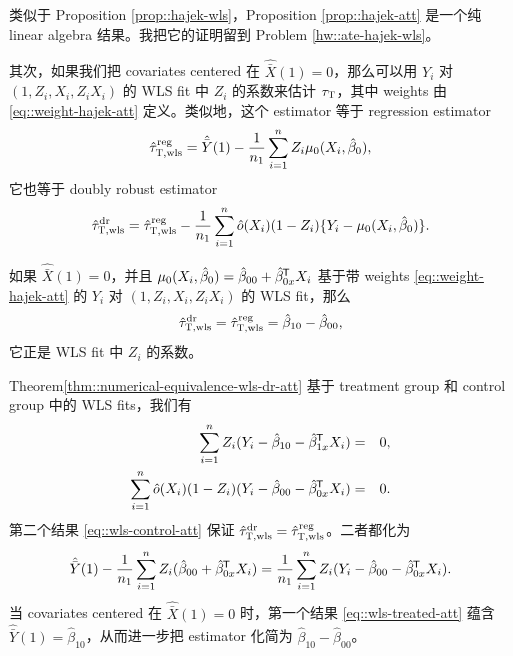 类似于 Proposition \ref{prop::hajek-wls}，Proposition \ref{prop::hajek-att} 是一个纯 linear algebra 结果。我把它的证明留到 Problem \ref{hw::ate-hajek-wls}。


其次，如果我们把 covariates centered 在 $\hat{\bar{X}}(1) = 0$，那么可以用 $Y_i$ 对 $(1,Z_i, X_i, Z_iX_i)$ 的 WLS fit 中 $Z_i$ 的系数来估计 $\tau_\textsc{T}$，其中 weights 由 \eqref{eq::weight-hajek-att} 定义。类似地，这个 estimator 等于 regression estimator
$$
\hat{\tau}_{\textsc{T},\text{wls}}^\text{reg} = \hat{\bar{Y}}(1) - \frac{1}{n_1} \sum_{i=1}^n Z_i \mu_0(X_i, \hat{\beta}_0),
$$
它也等于 doubly robust estimator
$$
\hat{\tau}_{\textsc{T},\text{wls}}^\text{dr} =\hat{\tau}_{\textsc{T},\text{wls}}^\text{reg} 
- \frac{1}{n_1} \sum_{i=1}^n  \hat{o}(X_i)  (1-Z_i) \{  Y_i- \mu_0(X_i, \hat{\beta}_0) \} .
$$

\begin{theorem}
\label{thm::numerical-equivalence-wls-dr-att}
如果 $\hat{\bar{X}}(1) = 0$，并且 $ \mu_0(X_i, \hat{\beta}_0) =  \hat \beta_{00} +   \hat\beta_{0x}^{\mkern-1.5mu\mathsf{T}} X_i$ 基于带 weights \eqref{eq::weight-hajek-att} 的 $Y_i$ 对 $(1,Z_i, X_i, Z_iX_i)$ 的 WLS fit，那么
$$
\hat{\tau}_{\textsc{T},\textup{wls}}^\textup{dr}  = \hat{\tau}_{\textsc{T},\textup{wls}}^\textup{reg} 
= \hat \beta_{10} - \hat \beta_{00} ,
$$
它正是 WLS fit 中 $Z_i$ 的系数。
\end{theorem}


\begin{myproof}{Theorem}{\ref{thm::numerical-equivalence-wls-dr-att}}
基于 treatment group 和 control group 中的 WLS fits，我们有
\begin{eqnarray}
\label{eq::wls-treated-att}
\sum_{i=1}^n Z_i ( Y_i -  \hat \beta_{10} -  \hat \beta_{1x}^{\mkern-1.5mu\mathsf{T}} X_i ) &=& 0 ,\\
\label{eq::wls-control-att}
 \sum_{i=1}^n \hat{o}(X_i)  (1-Z_i) ( Y_i - \hat \beta_{00} - \hat\beta_{0x}^{\mkern-1.5mu\mathsf{T}} X_i ) &=& 0.
\end{eqnarray}
第二个结果 \eqref{eq::wls-control-att} 保证 $\hat{\tau}_{\textsc{T},\text{wls}}^\text{dr}  = \hat{\tau}_{\textsc{T},\text{wls}}^\text{reg} $。二者都化为
$$
 \hat{\bar{Y}}(1) 
-  \frac{1}{n_1} \sum_{i=1}^n Z_i   (\hat \beta_{00} +   \hat\beta_{0x}^{\mkern-1.5mu\mathsf{T}} X_i)
= \frac{1}{n_1} \sum_{i=1}^n  Z_i(Y_i - \hat \beta_{00} - \hat\beta_{0x}^{\mkern-1.5mu\mathsf{T}} X_i) .
$$
当 covariates centered 在 $\hat{\bar{X}}(1) = 0$ 时，第一个结果 \eqref{eq::wls-treated-att} 蕴含 $\hat{\bar{Y}}(1)  =  \hat \beta_{10} $，从而进一步把 estimator 化简为 $ \hat \beta_{10} - \hat \beta_{00}$。
\end{myproof}






